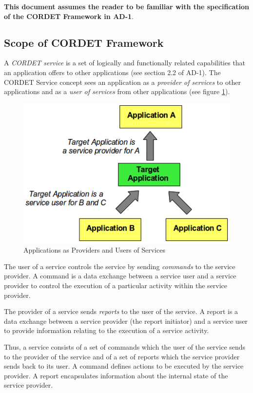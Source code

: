 \documentclass[a4paper,10pt]{article}
\begin{document}
\textbf{This document assumes the reader to be familiar with the specification of the CORDET Framework in AD-1}. 

\subsection{Scope of CORDET Framework}\label{sec:ScopeCrFw}
A \textit{CORDET service} is a set of logically and functionally related capabilities that an application offers to other applications (see section 2.2 of AD-1). The CORDET Service concept sees an application as a \textit{provider of services} to other applications and as a \textit{user of services} from other applications (see figure \ref{fig:ServConcept}).

\begin{figure}[ht]
 \centering
 \includegraphics[scale=0.4,keepaspectratio=true]{ServConcept.png}
 \caption{Applications as Providers and Users of Services}
 \label{fig:ServConcept}
\end{figure}

The user of a service controls the service by sending \textit{commands} to the service provider. A command is a data exchange between a service user and a service provider to control the execution of a particular activity within the service provider. 

The provider of a service sends \textit{reports} to the user of the service. A report is a data exchange between a service provider (the report initiator) and a service user to provide information relating to the execution of a service activity.

Thus, a service consists of a set of commands which the user of the service sends to the provider of the service and of a set of reports which the service provider sends back to its user. A command defines actions to be executed by the service provider. 
A report encapsulates information about the internal state of the service provider.
\end{document}
